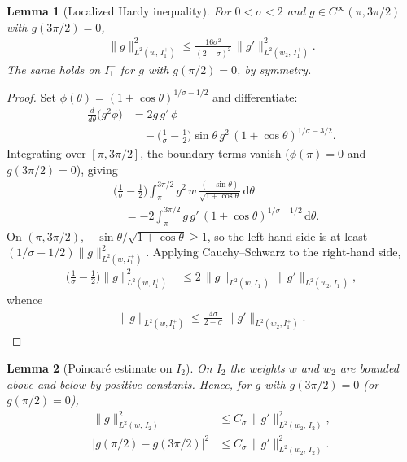 \documentclass[a4paper, 11pt]{article}
\newtheorem{lemma}{Lemma}
\begin{document}
\begin{lemma}[Localized Hardy inequality]\label{lem:hardy}
For $0 < \sigma < 2$ and $g \in C^\infty(\pi, 3\pi/2)$ with $g(3\pi/2) = 0$,
\begin{align}
    \|g\|_{L^2(w,\, I_1^+)}^2 \leq \frac{16\sigma^2}{(2-\sigma)^2}\, \|g'\|_{L^2(w_2,\, I_1^+)}^2.
\end{align}
The same holds on $I_1^-$ for $g$ with $g(\pi/2) = 0$, by symmetry.
\end{lemma}
\begin{proof}
Set $\phi(\theta) = (1+\cos\theta)^{1/\sigma - 1/2}$ and differentiate:
\begin{align}
    \frac{d}{d\theta}\big(g^2 \phi\big) &= 2g\, g'\, \phi \nonumber\\
    &\quad - \Big(\frac{1}{\sigma} - \frac{1}{2}\Big)\sin\theta\, g^2\, (1+\cos\theta)^{1/\sigma - 3/2}.
\end{align}
Integrating over $[\pi, 3\pi/2]$, the boundary terms vanish ($\phi(\pi) = 0$ and $g(3\pi/2) = 0$), giving
\begin{align}
    &\Big(\frac{1}{\sigma} - \frac{1}{2}\Big) \int_\pi^{3\pi/2} g^2\, w\, \frac{(-\sin\theta)}{\sqrt{1+\cos\theta}}\, \mathrm{d}\theta \nonumber\\
    &\quad = -2\int_\pi^{3\pi/2} g\, g'\, (1+\cos\theta)^{1/\sigma - 1/2}\, \mathrm{d}\theta.
\end{align}
On $(\pi, 3\pi/2)$, $-\sin\theta / \sqrt{1+\cos\theta} \geq 1$, so the left-hand side is at least $(1/\sigma - 1/2)\|g\|_{L^2(w,I_1^+)}^2$. Applying Cauchy--Schwarz to the right-hand side,
\begin{align}
    \Big(\frac{1}{\sigma} - \frac{1}{2}\Big)\|g\|_{L^2(w,I_1^+)}^2 &\leq 2\,\|g\|_{L^2(w,I_1^+)}\,\|g'\|_{L^2(w_2,I_1^+)},
\end{align}
whence
\begin{align}
    \|g\|_{L^2(w,I_1^+)} \leq \frac{4\sigma}{2-\sigma}\,\|g'\|_{L^2(w_2,I_1^+)}.
\end{align}
\end{proof}

\begin{lemma}[Poincar\'{e} estimate on $I_2$]\label{lem:poincare}
On $I_2$ the weights $w$ and $w_2$ are bounded above and below by positive constants. Hence, for $g$ with $g(3\pi/2) = 0$ (or $g(\pi/2)=0$),
\begin{align}
    \|g\|_{L^2(w,\,I_2)}^2 &\leq C_\sigma\, \|g'\|_{L^2(w_2,\,I_2)}^2, \\
    |g(\pi/2) - g(3\pi/2)|^2 &\leq C_\sigma\, \|g'\|_{L^2(w_2,\,I_2)}^2.
\end{align}
\end{lemma}
~\\
\end{document}
